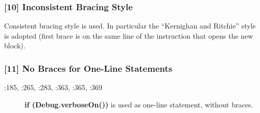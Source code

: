 \subsubsection{[10] Inconsistent Bracing Style}
Consistent bracing style is used. In particular the “Kernighan and Ritchie” style is adopted (first brace is on the same line of the instruction that opens the new block).

\subsubsection{[11] No Braces for One-Line Statements}
\begin{description}
	\item[:185, :265, :283, :363, :365, :369] \textbf{if (Debug.verboseOn())} is used as one-line statement, without braces.
\end{description}
